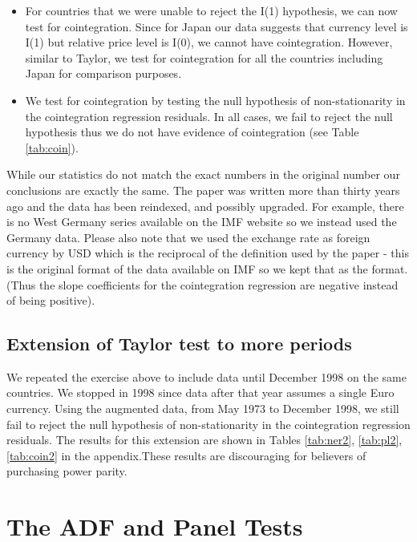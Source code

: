 \documentclass[]{article}
\providecommand{\tightlist}{%
  \setlength{\itemsep}{0pt}\setlength{\parskip}{0pt}}
\begin{document}
\begin{itemize}
  \begin{itemize}
  \tightlist
  \item
    For countries that we were unable to reject the I(1) hypothesis, we can now test for cointegration. Since for Japan our data suggests that currency level is I(1) but relative price level is I(0), we cannot have cointegration. However, similar to Taylor, we test for cointegration for all the countries including Japan for comparison purposes.
  \item
    We test for cointegration by testing the null hypothesis of non-stationarity in the cointegration regression residuals. In all cases, we fail to reject the null hypothesis thus we do not have evidence of cointegration (see Table \ref{tab:coin}).
  \end{itemize}
\end{itemize}

While our statistics do not match the exact numbers in the original number our conclusions are exactly the same. The paper was written more than thirty years ago and the data has been reindexed, and possibly upgraded. For example, there is no West Germany series available on the IMF website so we instead used the Germany data. Please also note that we used the exchange rate as foreign currency by USD which is the reciprocal of the definition used by the paper - this is the original format of the data available on IMF so we kept that as the format. (Thus the slope coefficients for the cointegration regression are negative instead of being positive).

\hypertarget{extension-of-taylor-test-to-more-periods}{%
\subsection{Extension of Taylor test to more periods}\label{extension-of-taylor-test-to-more-periods}}

We repeated the exercise above to include data until December 1998 on the same countries. We stopped in 1998 since data after that year assumes a single Euro currency. Using the augmented data, from May 1973 to December 1998, we still fail to reject the null hypothesis of non-stationarity in the cointegration regression residuals. The results for this extension are shown in Tables \ref{tab:ner2}, \ref{tab:pl2}, \ref{tab:coin2} in the appendix.These results are discouraging for believers of purchasing power parity.

\hypertarget{the-adf-and-panel-tests}{%
\section{The ADF and Panel Tests}\label{the-adf-and-panel-tests}}
\end{document}
